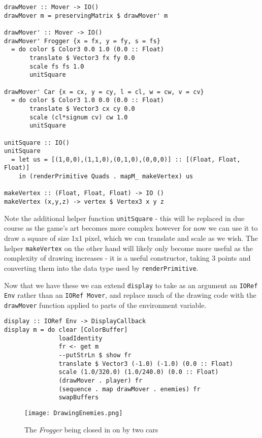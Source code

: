 \documentclass[12pt, a4paper]{report}
\begin{document}
\begin{lstlisting}
drawMover :: Mover -> IO()
drawMover m = preservingMatrix $ drawMover' m

drawMover' :: Mover -> IO()
drawMover' Frogger {x = fx, y = fy, s = fs}
  = do color $ Color3 0.0 1.0 (0.0 :: Float)
       translate $ Vector3 fx fy 0.0
       scale fs fs 1.0
       unitSquare

drawMover' Car {x = cx, y = cy, l = cl, w = cw, v = cv}
  = do color $ Color3 1.0 0.0 (0.0 :: Float)
       translate $ Vector3 cx cy 0.0
       scale (cl*signum cv) cw 1.0
       unitSquare

unitSquare :: IO()
unitSquare
  = let us = [(1,0,0),(1,1,0),(0,1,0),(0,0,0)] :: [(Float, Float, Float)]
    in (renderPrimitive Quads . mapM_ makeVertex) us

makeVertex :: (Float, Float, Float) -> IO ()
makeVertex (x,y,z) -> vertex $ Vertex3 x y z
\end{lstlisting}

Note the additional helper function \verb|unitSquare| - this will be replaced in due course as the game's art becomes more complex however for now we can use it to draw a square of size 1x1 pixel, which we can translate and scale as we wish.
The helper \verb|makeVertex| on the other hand will likely only become more useful as the complexity of drawing increases - it is a useful constructor, taking 3 points and converting them into the data type used by \verb|renderPrimitive|.

\par

Now that we have these we can extend \verb|display| to take as an argument an \verb|IORef Env| rather than an \verb|IORef Mover|, and replace much of the drawing code with the \verb|drawMover| function applied to parts of the environment variable.

\begin{lstlisting}
display :: IORef Env -> DisplayCallback
display m = do clear [ColorBuffer]
               loadIdentity
               fr <- get m
               --putStrLn $ show fr
               translate $ Vector3 (-1.0) (-1.0) (0.0 :: Float)
               scale (1.0/320.0) (1.0/240.0) (0.0 :: Float)
               (drawMover . player) fr
               (sequence . map drawMover . enemies) fr
               swapBuffers
\end{lstlisting}

\begin{figure}[ht]
  \centering
  \caption{The \textit{Frogger} being closed in on by two cars}
  \texttt{[image: DrawingEnemies.png]}
  \label{fig:drawingenemies}
\end{figure}
\end{document}
